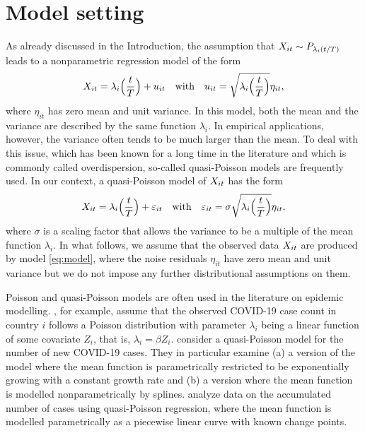 \documentclass[a4paper,12pt]{article}
\numberwithin{equation}{section}
\begin{document}
\section{Model setting}\label{sec:model}


As already discussed in the Introduction, the assumption that $X_{it} \sim P_{\lambda_i(t/T)}$ leads to a nonparametric regression model of the form 
\begin{equation}\label{eq:model-Poisson}
X_{it} = \lambda_i\Big(\frac{t}{T}\Big) + u_{it} \quad \text{with} \quad u_{it} = \sqrt{\lambda_i\Big(\frac{t}{T}\Big)} \eta_{it}, 
\end{equation}
where $\eta_{it}$ has zero mean and unit variance. In this model, both the mean and the variance are described by the same function $\lambda_i$. In empirical applications, however, the variance often tends to be much larger than the mean. To deal with this issue, which has been known for a long time in the literature \citep{Cox1983} and which is commonly called overdispersion, so-called quasi-Poisson models \citep{McCullagh1989, Efron1986} are frequently used. In our context, a quasi-Poisson model of $X_{it}$ has the form 
\begin{equation}\label{eq:model}
X_{it} = \lambda_i\Big(\frac{t}{T}\Big) + \varepsilon_{it} \quad \text{with} \quad \varepsilon_{it} = \sigma \sqrt{\lambda_i\Big(\frac{t}{T}\Big)} \eta_{it}, 
\end{equation}
where $\sigma$ is a scaling factor that allows the variance to be a multiple of the mean function $\lambda_i$. In what follows, we assume that the observed data $X_{it}$ are produced by model \eqref{eq:model}, where the noise residuals $\eta_{it}$ have zero mean and unit variance but we do not impose any further distributional assumptions on them.


Poisson and quasi-Poisson models are often used in the literature on epidemic modelling. \cite{De2020}, for example, assume that the observed COVID-19 case count in country $i$ follows a Poisson distribution with parameter $\lambda_i$ being a linear function of some covariate $Z_i$, that is, $\lambda_i = \beta Z_i$. \cite{Pellis2020} consider a quasi-Poisson model for the number of new COVID-19 cases. They in particular examine (a) a version of the model where the mean function is parametrically restricted to be exponentially growing with a constant growth rate and (b) a version where the mean function is modelled nonparametrically by splines. \cite{Tobias2020} analyze data on the accumulated number of cases using quasi-Poisson regression, where the mean function is modelled parametrically as a piecewise linear curve with known change points.
 
\end{document}
